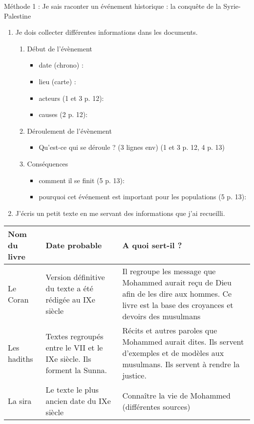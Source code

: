\documentclass[12pt,a4paper]{article}
\begin{document}
\begin{center}
{\Huge Méthode 1 : Je sais raconter un événement historique : la conquête de la Syrie-Palestine}
\end{center}

\begin{enumerate}
\item Je dois collecter différentes informations dans les documents.
\begin{enumerate}
\item Début de l'évènement
\begin{itemize}
\item date (chrono) : 
\item lieu (carte) : 
\item acteurs (1 et 3 p. 12): 
\item causes (2 p. 12):
\vspace{1cm}
\end{itemize}

\item Déroulement de l'évènement
\begin{itemize}
\item Qu'est-ce qui se déroule ? (3 lignes env) (1 et 3 p. 12, 4 p. 13)
\end{itemize}
\vspace{2cm}

\item Conséquences
\begin{itemize}
\item comment il se finit (5 p. 13): 
\item pourquoi cet événement est important pour les populations (5 p. 13): 
\end{itemize} 
\end{enumerate}

\vspace{2cm}

\item J'écris un petit texte en me servant des informations que j'ai recueilli.
\end{enumerate}

\vfill

\begin{tabular}{|p{6cm}|p{6cm}|p{6cm}|}
\hline Nom du livre & Date probable & A quoi sert-il ? \\ 
\hline Le Coran & Version définitive du texte a été rédigée au IXe siècle & Il regroupe les message que Mohammed aurait reçu de Dieu afin de les dire aux hommes. Ce livre est la base des croyances et devoirs des musulmans \\ 
\hline Les hadiths & Textes regroupés entre le VII et le IXe siècle. Ils forment la Sunna. & Récits et autres paroles que Mohammed aurait dites. Ils servent d'exemples et de modèles aux musulmans. Ils servent à rendre la justice. \\ 
\hline La sira & Le texte le plus ancien date du IXe siècle & Connaître la vie de Mohammed (différentes sources) \\ 
\hline 
\end{tabular} 
\end{document}
